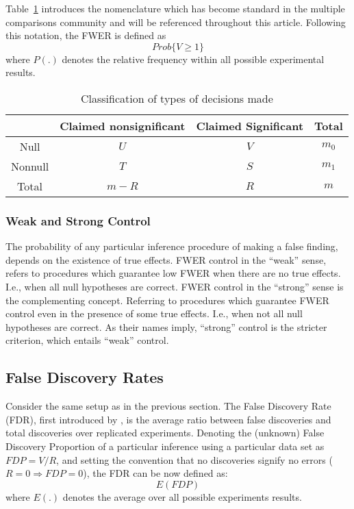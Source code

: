 \documentclass[review,12pt]{article}
\begin{document}
Table~\ref{tab:event_notation} introduces the nomenclature which has become standard in the multiple comparisons community and will be referenced throughout this article. Following this notation, the FWER is defined as $$Prob\{V \geq1  \}$$ where $P(.)$ denotes the relative frequency within all possible experimental results.



\begin{table}[h]
  \centering
\begin{tabular}{|c|c|c|c|}
\hline \rule[-1ex]{0pt}{1.5ex} & Claimed nonsignificant & Claimed Significant & Total \\ 
\hline
\hline \rule[-1ex]{0pt}{1.5ex} Null & $U$ & $V$ & $m_0$ \\ 
\hline \rule[-1ex]{0pt}{1.5ex} Nonnull & $T$ & $S$ & $m_1$ \\ 
\hline \rule[-1ex]{0pt}{1.5ex} Total & $m-R$ & $R$ & $m$ \\ 
\hline 
\end{tabular} 
  \caption{Classification of types of decisions made}
  \label{tab:event_notation}
\end{table}


\subsubsection{Weak and Strong Control}
The probability of any particular inference procedure of making a false finding, depends on the existence of true effects. FWER control in the ``weak'' sense, refers to procedures which guarantee low FWER when there are no true effects. I.e., when all null hypotheses are correct. 
FWER control in the ``strong'' sense is the complementing concept. Referring to procedures which guarantee FWER control even in the presence of some true effects. I.e., when not all null hypotheses are correct. 
As their names imply, ``strong'' control is the stricter criterion, which entails ``weak'' control.




\subsection{\label{sub:fdr}False Discovery Rates}

Consider the same setup as in the previous section. The False Discovery Rate (FDR), first introduced by \citet{benjamini_controlling_1995}, is the average ratio between false discoveries and total discoveries over replicated experiments. 
Denoting the (unknown) False Discovery Proportion of a particular inference using a particular data set as $ FDP=V/R $, and setting the convention that no discoveries signify no errors ($R=0 \Rightarrow FDP=0$), the FDR can be now defined as:
$$E \left( FDP \right)$$ 
where $E(.)$ denotes the average over all possible experiments results.
\end{document}
